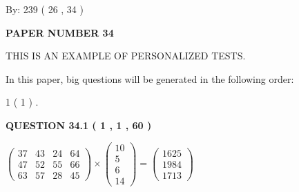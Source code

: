 \documentclass[12pt]{article}
\begin{document}
   
\hspace{1.0in} By: 
         239 (          26 ,           34 )
   
   
   
   
\newpage 
\setcounter{page}{ 
    34001 } 
   
   
   
   
 {\textbf{ \Large{ PAPER NUMBER           34  }}}
   
   
\vspace{0.2in}
   
   
   
   
   
   
 \vspace{0.2in}
{\Huge  THIS IS AN EXAMPLE OF}
{\Huge  PERSONALIZED TESTS. }
   
   
   
\vspace{0.2in}
   
In this paper, big questions will be generated in the following order: 
   
   
             1 (           1 )
 .
  
\vspace{0.2in}
  
{\textbf{\Large{QUESTION
34.1 
 (           1 ,           1 ,          60 )
}}}
  
  
 
 
\noindent{}

 
$\left( \begin{array}{ccccccccccccccc}
          37  & 
          43  & 
          24  & 
          64  \\ 
          47  & 
          52  & 
          55  & 
          66  \\ 
          63  & 
          57  & 
          28  & 
          45
\end{array}\right) \times
\left( \begin{array}{c}
          10  \\ 
           5  \\ 
           6  \\ 
          14
\end{array}\right)  =
\left( \begin{array}{c}
        1625  \\ 
        1984  \\ 
        1713
\end{array}\right)  $
 
\end{document}
